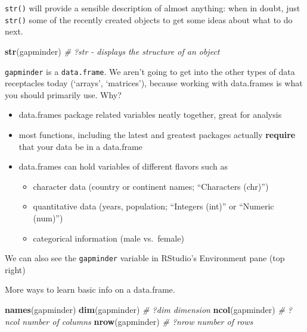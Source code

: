 \documentclass[]{book}
\newenvironment{Shaded}{\begin{snugshade}}{\end{snugshade}}
\newcommand{\KeywordTok}[1]{\textcolor[rgb]{0.13,0.29,0.53}{\textbf{{#1}}}}
\newcommand{\CommentTok}[1]{\textcolor[rgb]{0.56,0.35,0.01}{\textit{{#1}}}}
\newcommand{\NormalTok}[1]{{#1}}
\providecommand{\tightlist}{%
  \setlength{\itemsep}{0pt}\setlength{\parskip}{0pt}}
\theoremstyle{definition}
\theoremstyle{definition}
\theoremstyle{definition}
\theoremstyle{remark}
\begin{document}
\texttt{str()} will provide a sensible description of almost anything:
when in doubt, just \texttt{str()} some of the recently created objects
to get some ideas about what to do next.

\begin{Shaded}
\begin{Highlighting}[]
\KeywordTok{str}\NormalTok{(gapminder) }\CommentTok{# ?str - displays the structure of an object}
\end{Highlighting}
\end{Shaded}

\texttt{gapminder} is a \texttt{data.frame}. We aren't going to get into
the other types of data receptacles today (`arrays', `matrices'),
because working with data.frames is what you should primarily use. Why?

\begin{itemize}
\tightlist
\item
  data.frames package related variables neatly together, great for
  analysis
\item
  most functions, including the latest and greatest packages actually
  \textbf{require} that your data be in a data.frame
\item
  data.frames can hold variables of different flavors such as

  \begin{itemize}
  \tightlist
  \item
    character data (country or continent names; ``Characters (chr)'')
  \item
    quantitative data (years, population; ``Integers (int)'' or
    ``Numeric (num)'')
  \item
    categorical information (male vs.~female)
  \end{itemize}
\end{itemize}

We can also see the \texttt{gapminder} variable in RStudio's Environment
pane (top right)

More ways to learn basic info on a data.frame.

\begin{Shaded}
\begin{Highlighting}[]
\KeywordTok{names}\NormalTok{(gapminder)}
\KeywordTok{dim}\NormalTok{(gapminder)    }\CommentTok{# ?dim dimension}
\KeywordTok{ncol}\NormalTok{(gapminder)   }\CommentTok{# ?ncol number of columns}
\KeywordTok{nrow}\NormalTok{(gapminder)   }\CommentTok{# ?nrow number of rows}
\end{Highlighting}
\end{Shaded}
\end{document}
